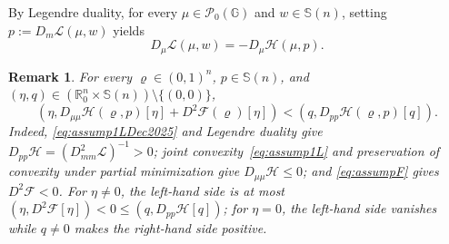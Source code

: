 \documentclass[10pt]{article}
\newtheorem{remark}[theorem]{Remark}
\numberwithin{equation}{section}
\newcommand{\cF}{ \mathcal{F}}
\newcommand{\cH}{ \mathcal{H}}
\newcommand{\cL}{ \mathcal{L}}
\newcommand{\cP}{ \mathcal{P}}
\newcommand{\bR}{\mathbb R}
\newcommand{\bS}{\mathbb S}
\def\cH{\mathcal{H}}
\def\cL{\mathcal{L}}
\def\G{\mathbb{G}}
\begin{document}
By Legendre duality, for every $\mu\in\cP_0(\G)$ and $w\in\bS(n)$, setting $p:=D_m\cL(\mu,w)$ yields
\begin{equation}\label{eq:aug23.2025.1}
D_\mu\cL(\mu,w)=-D_\mu\cH(\mu,p).
\end{equation}
%
%
\begin{remark} \label{rem:dec20.2025.1}
For every $\varrho \in (0,1)^n$, $p \in \bS(n)$, and $(\eta, q) \in (\bR^n_0 \times \bS(n)) \setminus \{(0,0)\}$,
\begin{equation}\label{eq:strong monotonicity from assumptions}
(\eta, D_{\mu\mu} \cH(\varrho,p)[\eta] + D^2\cF(\varrho)[\eta]) < (q, D_{pp}\cH(\varrho,p)[q]).
\end{equation}
Indeed, \eqref{eq:assump1LDec2025} and Legendre duality give $D_{pp}\cH=(D_{mm}^2\cL)^{-1}>0$; joint convexity~\eqref{eq:assump1L} and preservation of convexity under partial minimization give $D_{\mu\mu}\cH\leq 0$; and \eqref{eq:assumpF} gives $D^2\cF<0$. For $\eta\neq 0$, the left-hand side is at most $(\eta,D^2\cF[\eta])<0\leq(q,D_{pp}\cH[q])$; for $\eta=0$, the left-hand side vanishes while $q\neq 0$ makes the right-hand side positive.
\end{remark}
\end{document}
